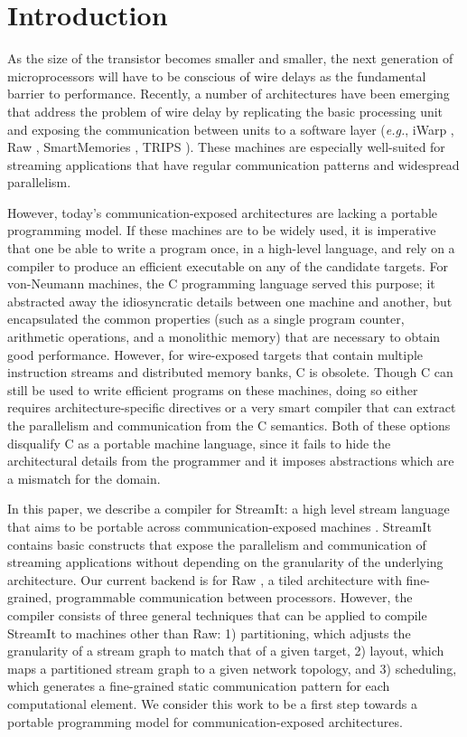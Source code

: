 \section{Introduction}

As the size of the transistor becomes smaller and smaller, the next
generation of microprocessors will have to be conscious of wire delays
as the fundamental barrier to performance.  Recently, a number of
architectures have been emerging that address the problem of wire
delay by replicating the basic processing unit and exposing the
communication between units to a software layer ({\it e.g.}, iWarp
\cite{??}, Raw \cite{rawshort}, SmartMemories \cite{smartmemories},
TRIPS \cite{trips}).  These machines are especially well-suited for
streaming applications that have regular communication patterns and
widespread parallelism.

However, today's communication-exposed architectures are lacking a
portable programming model.  If these machines are to be widely used,
it is imperative that one be able to write a program once, in a
high-level language, and rely on a compiler to produce an efficient
executable on any of the candidate targets. For von-Neumann machines,
the C programming language served this purpose; it abstracted away the
idiosyncratic details between one machine and another, but
encapsulated the common properties (such as a single program counter,
arithmetic operations, and a monolithic memory) that are necessary to
obtain good performance.  However, for wire-exposed targets that
contain multiple instruction streams and distributed memory banks, C
is obsolete.  Though C can still be used to write efficient programs
on these machines, doing so either requires architecture-specific
directives or a very smart compiler that can extract the parallelism
and communication from the C semantics.  Both of these options
disqualify C as a portable machine language, since it fails to hide
the architectural details from the programmer and it imposes
abstractions which are a mismatch for the domain.

In this paper, we describe a compiler for StreamIt: a high level
stream language that aims to be portable across communication-exposed
machines \cite{streamitcc}.  StreamIt contains basic constructs that
expose the parallelism and communication of streaming applications
without depending on the granularity of the underlying architecture.
Our current backend is for Raw \cite{rawshort}, a tiled architecture
with fine-grained, programmable communication between processors.
However, the compiler consists of three general techniques that can be
applied to compile StreamIt to machines other than Raw: 1)
partitioning, which adjusts the granularity of a stream graph to match
that of a given target, 2) layout, which maps a partitioned stream
graph to a given network topology, and 3) scheduling, which generates
a fine-grained static communication pattern for each computational
element.  We consider this work to be a first step towards a portable
programming model for communication-exposed architectures.


